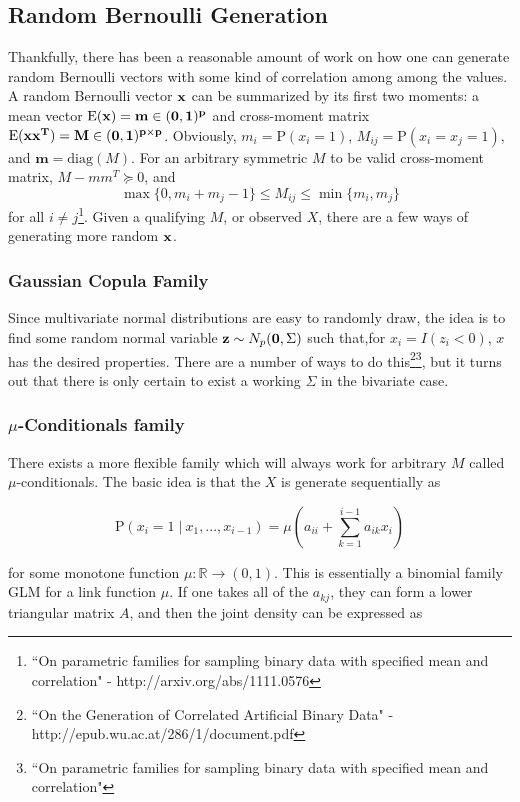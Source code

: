 \documentclass[11pt]{article}
\newcommand{\R}{\mathbb{R}}
\newcommand{\p}{\mathrm{P}}
\newcommand{\E}{\mathrm{E}}
\newcommand{\diag}{\mathrm{diag}}
\newcommand{\st}{ \; \big | \:}
\theoremstyle{definition}
\begin{document}
\subsection{Random Bernoulli Generation}
    Thankfully, there has been a reasonable amount of work on how one can generate random Bernoulli vectors with some kind of correlation among among the values. A random Bernoulli vector $\bf x$ can be summarized by its first two moments: a mean vector $\E(\bf x)=m\in(0,1)^p$ and cross-moment matrix $\E(\bf x\bf x^T)=M\in(0,1)^{p\times p}$. Obviously, $m_i = \p(x_i=1)$, $M_{ij} = \p(x_i=x_j=1)$, and $\mathbf m=\diag(M)$. For an arbitrary symmetric $M$ to be valid cross-moment matrix, $M-mm^T\succeq0$, and
    \[ \max\{0,m_i+m_j -1\} \leq M_{ij} \leq \min\{m_i,m_j\}\]
    for all $i\neq j$\footnote{``On parametric families for sampling binary data with specified mean and correlation" - http://arxiv.org/abs/1111.0576}. Given a qualifying $M$, or observed $X$, there are a few ways of generating more random $\bf x$.

\subsubsection{Gaussian Copula Family}
    Since multivariate normal distributions are easy to randomly draw, the idea is to find some random normal variable $\mathbf z\sim N_p({\bf 0},\Sigma)$ such that,for $x_i = I(z_i<0)$, $x$ has the desired properties. There are a number of ways to do this\footnote{``On the Generation of Correlated Artificial Binary Data" - http://epub.wu.ac.at/286/1/document.pdf}\footnote{``On parametric families for sampling binary data with specified mean and correlation"}, but it turns out that there is only certain to exist a working $\Sigma$ in the bivariate case. 

\subsubsection{$\mu$-Conditionals family}
    There exists a more flexible family which will always work for arbitrary $M$ called $\mu$-conditionals. The basic idea is that the $X$ is generate sequentially as 

    \[ \p(x_{i}=1\st x_{1},...,x_{i-1}) = \mu\left(a_{ii}+\sum_{k=1}^{i-1}a_{ik}x_i\right) \]

    for some monotone function $\mu:\R\to(0,1)$. This is essentially a binomial family GLM for a link function $\mu$. If one takes all of the $a_{kj}$, they can form a lower triangular matrix $A$, and then the joint density can be expressed as 
\end{document}
